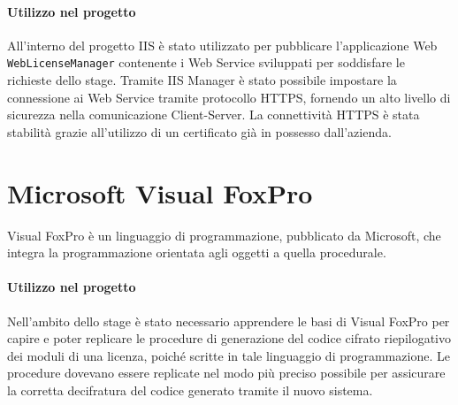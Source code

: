 \paragraph{Utilizzo nel progetto}
All'interno del progetto IIS è stato utilizzato per pubblicare l'applicazione Web \texttt{WebLicenseManager} contenente i Web Service sviluppati per soddisfare le richieste dello stage. Tramite IIS Manager è stato possibile impostare la connessione ai Web Service tramite protocollo HTTPS, fornendo un alto livello di sicurezza nella comunicazione Client-Server. La connettività HTTPS è stata stabilità grazie all'utilizzo di un certificato già in possesso dall'azienda.

\section{Microsoft Visual FoxPro}
Visual FoxPro è un linguaggio di programmazione, pubblicato da Microsoft, che integra la programmazione orientata agli oggetti a quella procedurale.

\paragraph{Utilizzo nel progetto}
Nell'ambito dello stage è stato necessario apprendere le basi di Visual FoxPro per capire e poter replicare le procedure di generazione del codice cifrato riepilogativo dei moduli di una licenza, poiché scritte in tale linguaggio di programmazione. Le procedure dovevano essere replicate nel modo più preciso possibile per assicurare la corretta decifratura del codice generato tramite il nuovo sistema. 